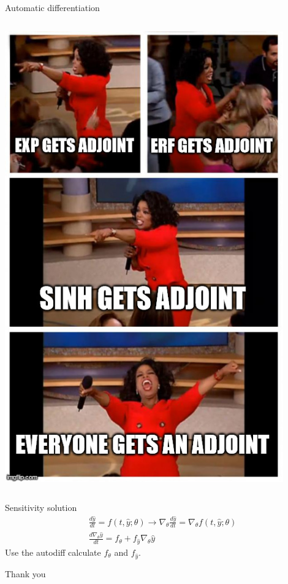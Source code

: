\documentclass[bigger]{beamer}
\begin{document}
\begin{frame}[label={sec:orgcb2d885}]{Automatic differentiation}
\begin{columns}
\begin{column}{0.5\columnwidth}
\begin{center}
\includegraphics[width=0.9\textwidth]{./figure/everyone_adjoint.jpg}
\end{center}
\end{column}
\end{columns}
\end{frame}

\begin{frame}[label={sec:orgba0bbfa}]{Sensitivity solution}
\begin{align*}
  &\frac{d\hat{y}}{dt} = f(t, \hat{y};\theta) \rightarrow \nabla_{\theta} \frac{d\hat{y}}{dt} = \nabla_{\theta} f(t, \hat{y};\theta)\\
  &\frac{d\nabla_{\theta} \hat{y}}{dt} = f_{\theta} + f_{\hat{y}}\nabla_{\theta}\hat{y}
\end{align*}
Use the autodiff calculate \(f_{\theta}\) and \(f_{\hat{y}}\).
\end{frame}


\begin{frame}[label={sec:org9578021}]{Thank you}
\end{frame}
\end{document}
